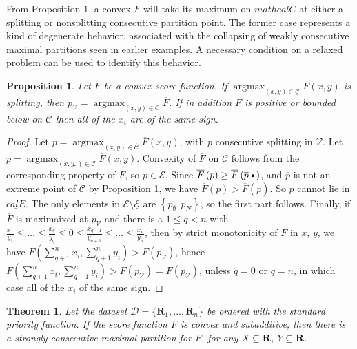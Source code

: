 \documentclass{article}
\newtheorem{thm}{Theorem}
\newtheorem{prop}{Proposition}
\theoremstyle{case}
\DeclareMathOperator*{\argmax}{argmax} %
\begin{document}
From Proposition 1, a convex $F$ will take its maximum on $\underline{mathcal{C}}$ at either a splitting or nonsplitting consecutive partition point. The former case represents a kind of degenerate behavior, associated with the collapsing of weakly consecutive maximal partitions seen in earlier examples. A necessary condition on a relaxed problem can be used to identify this behavior.

\begin{prop}
Let $F$ be a convex score function. If $\argmax_{\left( x,y\right) \in \underline{\mathcal{C}}} \overline{F}\left( x,y\right)$ is splitting, then $p_\mathcal{V} = \argmax_{\left( x,y\right) \in \mathcal{C}} \overline{F}$. If in addition $F$ is positive or bounded below on $\mathcal{C}$ then all of the $x_i$ are of the same sign.
\end{prop}
\begin{proof}
Let $\overline{p} = \argmax_{\left( x,y\right) \in \overline{\mathcal{C}}} \overline{F}\left( x,y\right)$, with $\overline{p}$ consecutive splitting in $\mathcal{V}$. Let $p = \argmax_{\left( x,y,\right) \in \mathcal{C}} \overline{F}\left( x,y\right)$. Convexity of $\overline{F}$ on $\mathcal{C}$ follows from the corresponding property of $F$, so $p \in \mathcal{E}$. Since $\overline{F}\left( p\right) \geq \overline{F}\left( \overline{p}\textsl{•}\right)$, and $\overline{p}$ is not an extreme point of $\mathcal{C}$ by Proposition 1, we have $\overline{F}\left( p\right) > \overline{F}\left( \underline{p}\right)$. So $p$ cannot lie in $\underline{cal{E}}$. The only elements in $\mathcal{E}\setminus \underline{\mathcal{E}}$ are $\left\lbrace p_{\emptyset}, p_{N}\right\rbrace$, so the first part follows. Finally, if $\overline{F}$ is maximaixed at $p_\mathcal{V}$ and there is a $1 \leq q < n$ with $\frac{x_1}{y_1} \leq \dots \leq \frac{x_q}{y_q} \leq 0 \leq \frac{x_{q+1}}{y_{q+1}} \leq \dots \leq \frac{x_n}{y_n}$, then by strict monotonicity of $F$ in $x$, $y$, we have $F\left( \sum_{q+1}^n x_i, \sum_{q+1}^n y_i\right) > F\left( p_\mathcal{V}\right)$, hence $\overline{F}\left( \sum_{q+1}^n x_i, \sum_{q+1}^n y_i\right) > F\left( p_\mathcal{V}\right) = \overline{F}\left( p_\mathcal{V}\right)$, unless $q = 0$ or $q = n$, in which case all of the $x_i$ of the same sign.
\end{proof}


\begin{thm} \label{thm1}
Let the dataset $\mathcal{D} = \{ \mathbf{R}_1, \ldots, \mathbf{R}_n \}$ be ordered with the standard priority function. If the score function $F$ is convex and subadditive, then there is a strongly consecutive maximal partition for $F$, for any $X \subseteq \mathbf{R}$, $Y \subseteq \mathbf{R}$.
\end{thm}
\end{document}
